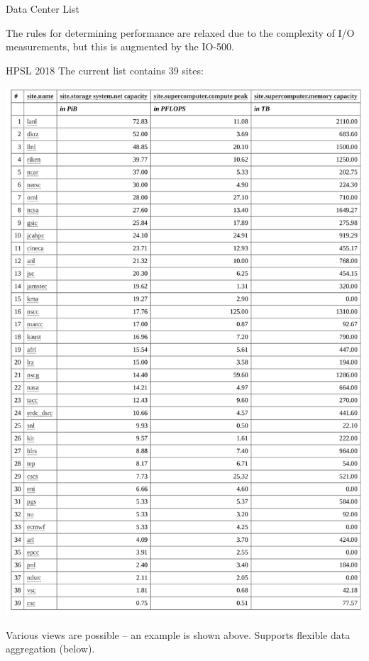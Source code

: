 \documentclass[portrait,a0paper,fontscale=0.4]{baposter}
\begin{document}
\begin{poster}
\begin{posterbox}[name=schedule,column=2,span=1, above=bottom, below=io500]{Data Center List}
\vspace*{-1em}

The rules for determining performance are relaxed due to the complexity of I/O measurements, but this is augmented by the IO-500.
\end{posterbox}




\begin{posterbox}[name=engineering,column=3]{HPSL 2018}
The current list contains 39 sites:

\includegraphics[width=\textwidth]{hpsl-current}


Various views are possible -- an example is shown above.
Supports flexible data aggregation (below).


\end{posterbox}
\end{poster}
\end{document}
